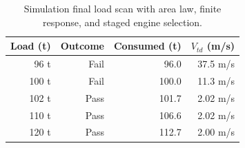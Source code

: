 \begin{table}[htbp]
\caption{Simulation final load scan with area law, finite response, and staged engine selection.}
\label{tab:src19}
\small
\setlength{\tabcolsep}{3.5pt}
\begin{tabularx}{\linewidth}{@{}rrrr@{}}
\toprule
Load (t) & Outcome & Consumed (t) & $V_{td}$ (m/s) \\
\midrule
96 t & Fail & 96.0 & 37.5 m/s \\
100 t & Fail & 100.0 & 11.3 m/s \\
102 t & Pass & 101.7 & 2.02 m/s \\
110 t & Pass & 106.6 & 2.02 m/s \\
120 t & Pass & 112.7 & 2.00 m/s \\
\bottomrule
\end{tabularx}
\end{table}
